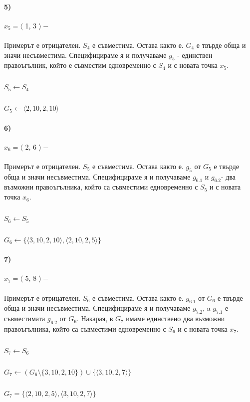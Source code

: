 \documentclass[12pt]{article}
\begin{document}
	\paragraph{5)} $x_{5} = \langle $ 1, 3 $\rangle  -$
	\paragraph{}
	Примерът е отрицателен. $S_{4}$ е съвместима. Остава както е. $G_{4}$ е твърде обща и значи несъвместима. Специфицираме я и получаваме $g_{5}$ - единствен правоъгълник, който е съвместим едновременно с $S_{4}$ и с новата точка $x_{5}$.
		\subparagraph{}
		$S_{5} \leftarrow S_{4}$
		\subparagraph{}
		$G_{5} \leftarrow \langle 2, 10, 2, 10 \rangle$
		
	\paragraph{6)} $x_{6} = \langle $ 2, 6 $\rangle  -$
	\paragraph{}
	Примерът е отрицателен. $S_{5}$ е съвместима. Остава както е. $g_{5}$ от $G_{5}$ е твърде обща и значи несъвместима. Специфицираме я и получаваме $g_{6.1}$ и $g_{6.2}$- два възможни правоъгълника, който са съвместими едновременно с $S_{5}$ и с новата точка $x_{6}$.
		\subparagraph{}
		$S_{6} \leftarrow S_{5}$
		\subparagraph{}
		$G_{6} \leftarrow \{ \langle 3, 10, 2, 10 \rangle,\langle 2, 10, 2, 5 \rangle \}$
		
	\paragraph{7)} $x_{7} = \langle $ 5, 8 $\rangle  -$
	\paragraph{}
	Примерът е отрицателен. $S_{6}$ е съвместима. Остава както е. $g_{6.1}$ от $G_{6}$ е твърде обща и значи несъвместима. Специфицираме я и получаваме $g_{7.2}$, a $g_{7.1}$ е съвместимата $g_{6.2}$ от $G_{6}$. Накарая, в $G_{7}$ имаме единствено два възможни правоъгълника, който са съвместими едновременно с $S_{6}$ и с новата точка $x_{7}$.
	\subparagraph{}
	$S_{7} \leftarrow S_{6}$
	\subparagraph{}
	$G_{7} \leftarrow (G_{6}\setminus\{3,10,2,10\}) \cup  \{ \langle 3, 10, 2, 7 \rangle \}$
	\subparagraph{}
	$G_{7} = \{ \langle 2, 10, 2, 5 \rangle,\langle 3, 10, 2, 7 \rangle \}$
	
\end{document}
